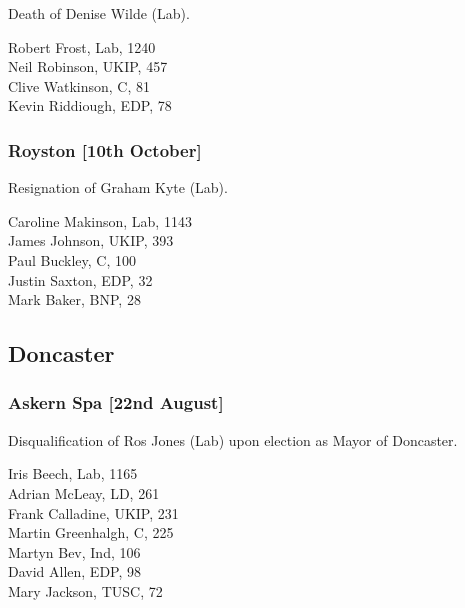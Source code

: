 \documentclass[a4paper,openany,10pt]{book}
\begin{document}

Death of Denise Wilde (Lab).



Robert Frost, Lab, 1240\\
Neil Robinson, UKIP, 457\\
Clive Watkinson, C, 81\\
Kevin Riddiough, EDP, 78\\


\subsubsection*{Royston \hspace*{\fill}\nolinebreak[1]%
\enspace\hspace*{\fill}
[10th October]}


Resignation of Graham Kyte (Lab).



Caroline Makinson, Lab, 1143\\
James Johnson, UKIP, 393\\
Paul Buckley, C, 100\\
Justin Saxton, EDP, 32\\
Mark Baker, BNP, 28\\


\subsection*{Doncaster}

\subsubsection*{Askern Spa \hspace*{\fill}\nolinebreak[1]%
\enspace\hspace*{\fill}
[22nd August]}


Disqualification of Ros Jones (Lab) upon election as Mayor of Doncaster.



Iris Beech, Lab, 1165\\
Adrian McLeay, LD, 261\\
Frank Calladine, UKIP, 231\\
Martin Greenhalgh, C, 225\\
Martyn Bev, Ind, 106\\
David Allen, EDP, 98\\
Mary Jackson, TUSC, 72\\
\end{document}
